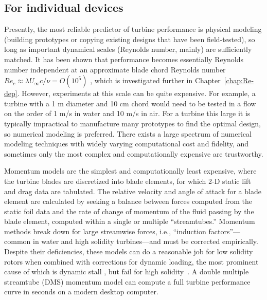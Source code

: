 \subsection{For individual devices}

Presently, the most reliable predictor of turbine performance is physical
modeling (building prototypes or copying existing designs that have been
field-tested), so long as important dynamical scales (Reynolds number, mainly)
are sufficiently matched. It has been shown that performance becomes essentially
Reynolds number independent at an approximate blade chord Reynolds number $Re_c
\approx \lambda U_\infty c / \nu = O(10^5)$ \cite{Bravo2007}, which is
investigated further in Chapter~\ref{chap:Re-dep}. However, experiments at this
scale can be quite expensive. For example, a turbine with a 1 m diameter and 10
cm chord would need to be tested in a flow on the order of 1 m/s in water and 10
m/s in air. For a turbine this large it is typically impractical to manufacture
many prototypes to find the optimal design, so numerical modeling is preferred.
There exists a large spectrum of numerical modeling techniques with widely
varying computational cost and fidelity, and sometimes only the most complex and
computationally expensive are trustworthy.


Momentum models are the simplest and computationally least expensive, where the
turbine blades are discretized into blade elements, for which 2-D static lift
and drag data are tabulated. The relative velocity and angle of attack for a
blade element are calculated by seeking a balance between forces computed from
the static foil data and the rate of change of momentum of the fluid passing by
the blade element, computed within a single or multiple ``streamtubes.''
Momentum methods break down for large streamwise forces, i.e., ``induction
factors''---common in water and high solidity turbines---and must be corrected
empirically. Despite their deficiencies, these models can do a reasonable job
for low solidity rotors when combined with corrections for dynamic loading, the
most prominent cause of which is dynamic stall \cite{Para2002}, but fail for
high solidity~\cite{Joo2015}. A double multiple streamtube (DMS) momentum model
can compute a full turbine performance curve in seconds on a modern desktop
computer.

